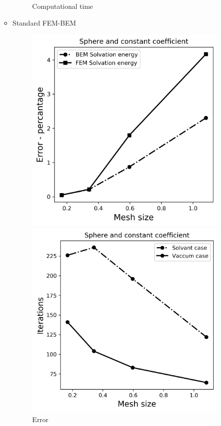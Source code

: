 \begin{itemize}
\begin{itemize}
\begin{figure}[!htb]
  \caption{Computational time}
\endminipage
\end{figure}
        \item Standard FEM-BEM
\begin{figure}[!htb]
  \includegraphics[width=\linewidth]{FEM_BEM_Sphere_const_coeff_error.png}
  \caption{Error}
\endminipage\hfill
{}
  \includegraphics[width=\linewidth]{FEM_BEM_Sphere_const_coeff_iter.png}

\end{figure}
\end{itemize}
\end{itemize}
